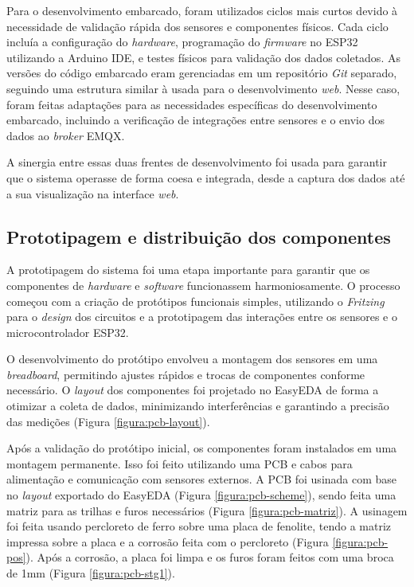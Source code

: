 Para o desenvolvimento embarcado, foram utilizados ciclos mais curtos devido à necessidade de validação rápida dos sensores e componentes físicos. Cada ciclo incluía a configuração do \textit{hardware}, programação do \textit{firmware} no ESP32 utilizando a Arduino IDE, e testes físicos para validação dos dados coletados. As versões do código embarcado eram gerenciadas em um repositório \textit{Git} separado, seguindo uma estrutura similar à usada para o desenvolvimento \textit{web}. Nesse caso, foram feitas adaptações para as necessidades específicas do desenvolvimento embarcado, incluindo a verificação de integrações entre sensores e o envio dos dados ao \textit{broker} EMQX.

A sinergia entre essas duas frentes de desenvolvimento foi usada para garantir que o sistema operasse de forma coesa e integrada, desde a captura dos dados até a sua visualização na interface \textit{web}.

\subsection{Prototipagem e distribuição dos componentes}

A prototipagem do sistema foi uma etapa importante para garantir que os componentes de \textit{hardware} e \textit{software} funcionassem harmoniosamente. O processo começou com a criação de protótipos funcionais simples, utilizando o \textit{Fritzing} para o \textit{design} dos circuitos e a prototipagem das interações entre os sensores e o microcontrolador ESP32.

O desenvolvimento do protótipo envolveu a montagem dos sensores em uma \textit{breadboard}, permitindo ajustes rápidos e trocas de componentes conforme necessário. O \textit{layout} dos componentes foi projetado no EasyEDA de forma a otimizar a coleta de dados, minimizando interferências e garantindo a precisão das medições (Figura \ref{figura:pcb-layout}). 

Após a validação do protótipo inicial, os componentes foram instalados em uma montagem permanente. Isso foi feito utilizando uma PCB e cabos para alimentação e comunicação com sensores externos. A PCB foi usinada com base no \textit{layout} exportado do EasyEDA (Figura \ref{figura:pcb-scheme}), sendo feita uma matriz para as trilhas e furos necessários (Figura \ref{figura:pcb-matriz}). A usinagem foi feita usando percloreto de ferro sobre uma placa de fenolite, tendo a matriz impressa sobre a placa e a corrosão feita com o percloreto (Figura \ref{figura:pcb-pos}). Após a corrosão, a placa foi limpa e os furos foram feitos com uma broca de 1mm (Figura \ref{figura:pcb-stg1}).


